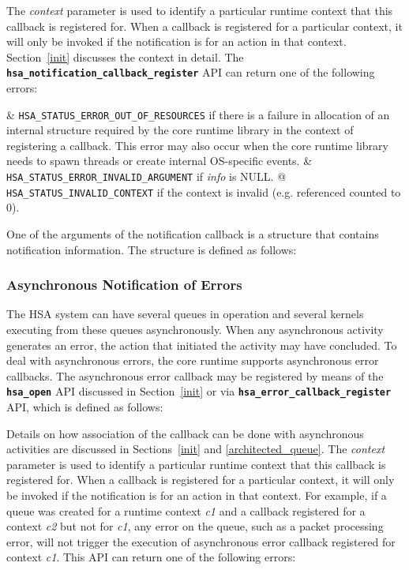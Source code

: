 \documentclass{book}
\newcommand{\diffblock}[1]{#1}
\newcommand{\ttbf}[1]{\diffblock{\texttt{\textbf{#1}}}}
\newcommand{\dbtt}[1]{\diffblock{\texttt{#1}}}
\begin{document}


The {\itshape context} parameter is used to identify a particular
runtime context that this callback is registered for. When a
callback is registered for a particular context, it will only be
invoked if the notification is for an action in that context.
Section~\ref{init} discusses the context in detail. The
\ttbf{hsa\_notification\_callback\_register} API can return one of
the following errors:
\begin{easylist}
& \dbtt{HSA\_STATUS\_ERROR\_OUT\_OF\_RESOURCES} if there is a failure
in allocation of an internal structure required by the core runtime
library in the context of registering a callback. This error may
also occur when the core runtime library needs to spawn threads or
create internal OS-specific events.
& \dbtt{HSA\_STATUS\_ERROR\_INVALID\_ARGUMENT}
if {\itshape info} is NULL.
@ \dbtt{HSA\_STATUS\_INVALID\_CONTEXT} if the context is invalid
(e.g. referenced counted to 0).
\end{easylist}

One of the arguments of the notification callback is a structure
that contains notification information. The structure is defined as
follows:



\subsubsection{Asynchronous Notification of Errors}\label{asynnotif}

The HSA system can have several queues in operation and
several kernels executing from these queues asynchronously.
When any asynchronous activity generates an error, the action that
initiated the activity may have concluded. To deal with
asynchronous errors, the core runtime supports asynchronous error
callbacks. The asynchronous error callback may be registered by means of the
\ttbf{hsa\_open} API discussed in Section~\ref{init} or via
\ttbf{hsa\_error\_callback\_register} API, which is defined as
follows:



Details on how association of the callback can be done with
asynchronous activities are discussed in Sections~\ref{init} and
\ref{architected_queue}. The {\itshape context} parameter is used
to identify a particular runtime context that this callback is
registered for. When a callback is registered for a particular
context, it will only be invoked if the notification is for an
action in that context. For example, if a queue was created for a
runtime context {\itshape c1} and a callback registered for a
context {\itshape c2} but not for {\itshape c1}, any error on the
queue, such as a packet processing error, will not trigger the
execution of asynchronous error callback registered for context
{\itshape c1}. This API can return one of the following errors:
\end{document}
